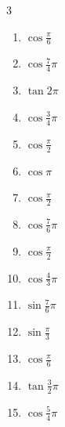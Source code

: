 \begin{multicols}{3}
\begin{enumerate}
  \item $\displaystyle \cos{\frac{\pi}{6}}$

  \item $\displaystyle \cos{\frac{7}{4}\pi}$

  \item $\displaystyle \tan{2\pi}$
        \phantom{$\displaystyle =0$}

  \item $\displaystyle \cos{\frac{3}{4}\pi}$

  \item $\displaystyle \cos{\frac{\pi}{2}}$
        \phantom{$\displaystyle =0$}

  \item $\displaystyle \cos{\pi}$
        \phantom{$\displaystyle =-1$}

  \item $\displaystyle \cos{\frac{\pi}{2}}$
        \phantom{$\displaystyle =0$}

  \item $\displaystyle \cos{\frac{7}{6}\pi}$

  \item $\displaystyle \cos{\frac{\pi}{2}}$
        \phantom{$\displaystyle =0$}

  \item $\displaystyle \cos{\frac{4}{3}\pi}$

  \item $\displaystyle \sin{\frac{7}{6}\pi}$

  \item $\displaystyle \sin{\frac{\pi}{3}}$

\columnbreak %

\resetques

  \item $\displaystyle \cos{\frac{\pi}{6}}$

  \item $\displaystyle \tan{\frac{3}{2}\pi}$
        \phantom{$\displaystyle \quad なし$}

  \item $\displaystyle \cos{\frac{5}{4}\pi}$


\end{enumerate}
\end{multicols}
